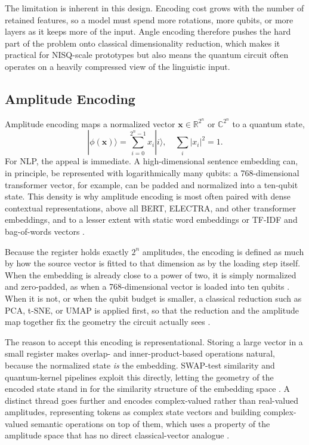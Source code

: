 \documentclass{ieeeaccess}
\begin{document}
The limitation is inherent in this design. Encoding cost grows with the number of retained features, so a model must spend more rotations, more qubits, or more layers as it keeps more of the input. Angle encoding therefore pushes the hard part of the problem onto classical dimensionality reduction, which makes it practical for NISQ-scale prototypes but also means the quantum circuit often operates on a heavily compressed view of the linguistic input.


\subsection{Amplitude Encoding}
\label{subsec:amplitude_encoding}

Amplitude encoding maps a normalized vector $\mathbf{x} \in \mathbb{R}^{2^n}$ or $\mathbb{C}^{2^n}$ to a quantum state,
\begin{equation}
|\phi(\mathbf{x})\rangle = \sum_{i=0}^{2^n-1} x_i |i\rangle,
\quad \sum_i |x_i|^2 = 1.
\end{equation}
For NLP, the appeal is immediate. A high-dimensional sentence embedding can, in principle, be represented with logarithmically many qubits: a 768-dimensional transformer vector, for example, can be padded and normalized into a ten-qubit state. This density is why amplitude encoding is most often paired with dense contextual representations, above all BERT, ELECTRA, and other transformer embeddings, and to a lesser extent with static word embeddings or TF-IDF and bag-of-words vectors \cite{buonaiuto_quantum_2024,guarasci_applying_2025,cavar_old_2026,zeguendry_quantum_2024}.

Because the register holds exactly $2^n$ amplitudes, the encoding is defined as much by how the source vector is fitted to that dimension as by the loading step itself. When the embedding is already close to a power of two, it is simply normalized and zero-padded, as when a 768-dimensional vector is loaded into ten qubits \cite{guarasci_applying_2025,buonaiuto_multilingual_2025}. When it is not, or when the qubit budget is smaller, a classical reduction such as PCA, t-SNE, or UMAP is applied first, so that the reduction and the amplitude map together fix the geometry the circuit actually sees \cite{korrapati_quantum_2025,zhang_entangled_2024,tufchi_quantum-enhanced_2026}.

The reason to accept this encoding is representational. Storing a large vector in a small register makes overlap- and inner-product-based operations natural, because the normalized state \emph{is} the embedding. SWAP-test similarity and quantum-kernel pipelines exploit this directly, letting the geometry of the encoded state stand in for the similarity structure of the embedding space \cite{cavar_word_2025,zeguendry_quantum_2024,schuld2019quantum}. A distinct thread goes further and encodes complex-valued rather than real-valued amplitudes, representing tokens as complex state vectors and building complex-valued semantic operations on top of them, which uses a property of the amplitude space that has no direct classical-vector analogue \cite{routh_quantum_2026,cavar_old_2026}.
\end{document}
